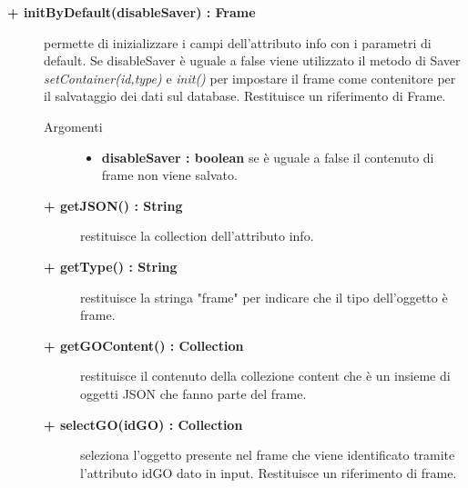 \begin{description}
\begin{description}
\end{description}

\begin{description}
		\item[\textbf{\color{blue}+ initByDefault(disableSaver) : Frame			}] \hfill
			permette di inizializzare i campi dell'attributo info con i parametri di default. Se disableSaver è uguale a false viene utilizzato il metodo di Saver \textit{setContainer(id,type)} e \textit{init()} per impostare il frame come contenitore per il salvataggio dei dati sul database. Restituisce un riferimento di Frame.

\begin{description}
			\item[Argomenti] \hfill
				\begin{itemize}
						\item \textbf{disableSaver : boolean			} \hfill
					se è uguale a false il contenuto di frame non viene salvato. %
				\end{itemize}

\end{description}

\begin{description}
		\item[\textbf{\color{blue}+ getJSON() : String			}] \hfill
			restituisce la collection dell'attributo info.

\end{description}

\begin{description}
		\item[\textbf{\color{blue}+ getType() : String			}] \hfill
			restituisce la stringa "frame" per indicare che il tipo dell'oggetto è frame.
\end{description}

\begin{description}
		\item[\textbf{\color{blue}+ getGOContent() : Collection			}] \hfill
			restituisce il contenuto della collezione content che è un insieme di oggetti JSON che fanno parte del frame.
\end{description}

\begin{description}
		\item[\textbf{\color{blue}+ selectGO(idGO) : Collection			}] \hfill
			seleziona l'oggetto presente nel frame che viene identificato tramite l'attributo idGO dato in input. Restituisce un riferimento di frame. 


\end{description}
\end{description}
\end{description}
